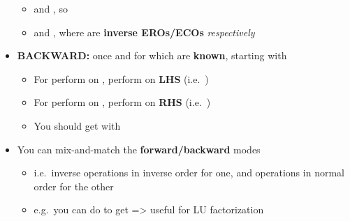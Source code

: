 \begin{itemize}
        \begin{itemize}

          \item
                 and
                , so
          \item
                 and
                , where
                 are \textbf{inverse EROs/ECOs}
                \emph{respectively}
        \end{itemize}
  \item
        \textbf{BACKWARD:} once  and
         for which  are
        \textbf{known}, starting with \iMbox{[I_{m} \ | \ A \ | \ I_{n}]}

        \begin{itemize}

          \item
                For  perform  on
                , perform  on \textbf{LHS}
                (i.e.~)
          \item
                For  perform  on ,
                perform  on \textbf{RHS}
                (i.e.~)
          \item
                You should get
                \iMbox{\ds [I_{m} \ | \ A \ | \ I_{n}] \rightsquigarrow [R^{-1} \ | \ A' \ | \ C^{-1}]}
                with 
        \end{itemize}
  \item
        You can mix-and-match the \textbf{forward/backward} modes

        \begin{itemize}

          \item
                i.e.~inverse operations in inverse order for one, and operations in
                normal order for the other
          \item
                e.g.~you can do
                \iMbox{\ds [I_{m} \ | \ A \ | \ I_{n}] \rightsquigarrow [R^{-1} \ | \ A' \ | \ C]}
                to get  => useful for LU
                factorization
        \end{itemize}
\end{itemize}

